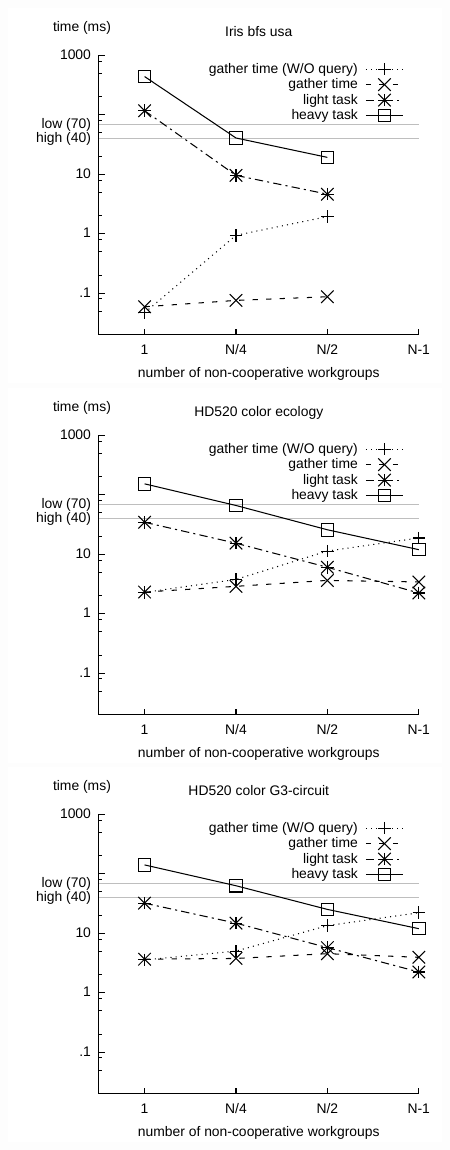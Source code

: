 \documentclass[sigconf]{acmart}
\begin{document}
{\includegraphics[width=.7\columnwidth]{images/barrier/iris_bfs_usa.pdf} \\
\includegraphics[width=.7\columnwidth]{images/barrier/hd520_color_ecology.pdf} \\
\includegraphics[width=.7\columnwidth]{images/barrier/hd520_color_G3_circuit.pdf} \\
}
\end{document}
